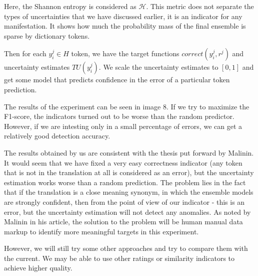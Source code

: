 \documentclass[a4paper,14pt]{extarticle}
\begin{document}
	Here, the Shannon entropy is considered as $\mathcal{H}$. This metric does not separate the types of uncertainties that we have discussed earlier, it is an indicator for any manifestation. It shows how much the probability mass of the final ensemble is sparse by dictionary tokens.

	Then for each $y_i^j \in H$ token, we have the target functions $correct(y_i^j, r^j)$ and uncertainty estimates $TU (y_i^j)$. We scale the uncertainty estimates to $[0, 1]$ and get some model that predicts confidence in the error of a particular token prediction.
	
	\begin{figure}[t]
	\end{figure}
	The results of the experiment can be seen in image 8. If we try to maximize the F1-score, the indicators turned out to be worse than the random predictor. However, if we are intesting only in a small percentage of errors, we can get a relatively good detection accuracy.

	The results obtained by us are consistent with the thesis put forward by Malinin. It would seem that we have fixed a very easy correctness indicator (any token that is not in the translation at all is considered as an error), but the uncertainty estimation works worse than a random prediction. The problem lies in the fact that if the translation is a close meaning synonym, in which the ensemble models are strongly confident, then from the point of view of our indicator - this is an error, but the uncertainty estimation will not detect any anomalies. As noted by Malinin in his article, the solution to the problem will be human manual data markup to identify more meaningful targets in this experiment.

	However, we will still try some other approaches and try to compare them with the current. We may be able to use other ratings or similarity indicators to achieve higher quality.
	
\end{document}
